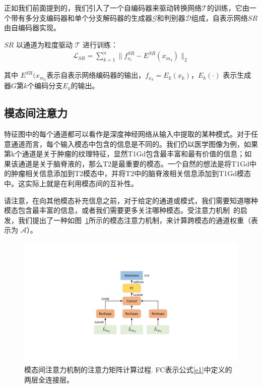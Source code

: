 正如我们前面提到的，我们引入了一个自编码器来驱动转换网络$\mathcal{T}$的训练，它由一个带有多分支编码器和单个分支解码器的生成器$\mathcal{G}$和判别器$\mathcal{D}$组成，自表示网络$SR$由自编码器实现。

$SR$ 以通道为粒度驱动 $\mathcal{T}$ 进行训练：
\begin{align}
	\mathcal{L}_{SR} = \sum_{k=1}^n \|f^{SR}_{x_i}- E^{SR}(x_{m_4})\|_2
\end{align}

其中 $E^{SR}(x_{m_4}$表示自表示网络编码器的输出，$f_{x_k}=E_k(x_k)$，$E_k(\cdot)$ 表示生成器$G$第$k$个编码分支$E_k$的输出。

\subsection{模态间注意力}

特征图中的每个通道都可以看作是深度神经网络从输入中提取的某种模式。对于任意通道而言，每个输入模态中包含的信息是不同的。我们仍以医学图像为例，如果第k个通道是关于肿瘤的纹理特征，显然T1Gd包含最丰富和最有价值的信息；如果该通道是关于脑脊液的，那么T2是最重要的模态。一个自然的想法是将T1Gd中的肿瘤相关信息添加到T2模态中，并将T2中的脑脊液相关信息添加到T1Gd模态中。这实际上就是在利用模态间的互补性。

请注意，在向其他模态补充信息之前，对于给定的通道或模式，我们需要知道哪种模态包含最丰富的信息，或者我们需要更多关注哪种模态。受注意力机制~\cite{seq2seq,attentionallyouneed,nonlocal,sagan}的启发，我们提出了一种如图~\ref{f2}所示的模态注意力机制，来计算跨模态的通道权重（表示为 $\mathcal{A}$）。

\begin{figure}
	\centering
	\includegraphics[width=0.8\columnwidth]{figures/JAGAN/20201109InterAttention_function_AV1_0.pdf}
	\caption[]{模态间注意力机制的注意力矩阵计算过程. FC表示公式\ref{e1}中定义的两层全连接层。}
	\label{f2}
\end{figure}

